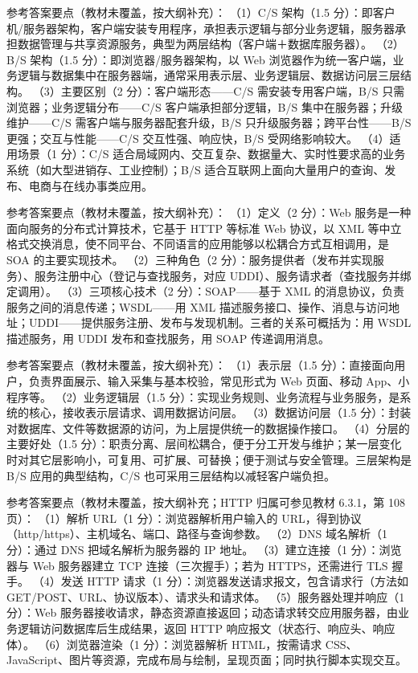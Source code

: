 \documentclass[a4paper,11pt]{article}
\begin{document}
\q 参考答案要点（教材未覆盖，按大纲补充）：
（1）C/S 架构（1.5 分）：即客户机/服务器架构，客户端安装专用程序，承担表示逻辑与部分业务逻辑，服务器承担数据管理与共享资源服务，典型为两层结构（客户端＋数据库服务器）。
（2）B/S 架构（1.5 分）：即浏览器/服务器架构，以 Web 浏览器作为统一客户端，业务逻辑与数据集中在服务器端，通常采用表示层、业务逻辑层、数据访问层三层结构。
（3）主要区别（2 分）：客户端形态——C/S 需安装专用客户端，B/S 只需浏览器；业务逻辑分布——C/S 客户端承担部分逻辑，B/S 集中在服务器；升级维护——C/S 需客户端与服务器配套升级，B/S 只升级服务器；跨平台性——B/S 更强；交互与性能——C/S 交互性强、响应快，B/S 受网络影响较大。
（4）适用场景（1 分）：C/S 适合局域网内、交互复杂、数据量大、实时性要求高的业务系统（如大型进销存、工业控制）；B/S 适合互联网上面向大量用户的查询、发布、电商与在线办事类应用。

\q 参考答案要点（教材未覆盖，按大纲补充）：
（1）定义（2 分）：Web 服务是一种面向服务的分布式计算技术，它基于 HTTP 等标准 Web 协议，以 XML 等中立格式交换消息，使不同平台、不同语言的应用能够以松耦合方式互相调用，是 SOA 的主要实现技术。
（2）三种角色（2 分）：服务提供者（发布并实现服务）、服务注册中心（登记与查找服务，对应 UDDI）、服务请求者（查找服务并绑定调用）。
（3）三项核心技术（2 分）：SOAP——基于 XML 的消息协议，负责服务之间的消息传递；WSDL——用 XML 描述服务接口、操作、消息与访问地址；UDDI——提供服务注册、发布与发现机制。三者的关系可概括为：用 WSDL 描述服务，用 UDDI 发布和查找服务，用 SOAP 传递调用消息。

\q 参考答案要点（教材未覆盖，按大纲补充）：
（1）表示层（1.5 分）：直接面向用户，负责界面展示、输入采集与基本校验，常见形式为 Web 页面、移动 App、小程序等。
（2）业务逻辑层（1.5 分）：实现业务规则、业务流程与业务服务，是系统的核心，接收表示层请求、调用数据访问层。
（3）数据访问层（1.5 分）：封装对数据库、文件等数据源的访问，为上层提供统一的数据操作接口。
（4）分层的主要好处（1.5 分）：职责分离、层间松耦合，便于分工开发与维护；某一层变化时对其它层影响小，可复用、可扩展、可替换；便于测试与安全管理。三层架构是 B/S 应用的典型结构，C/S 也可采用三层结构以减轻客户端负担。

\q 参考答案要点（教材未覆盖，按大纲补充；HTTP 归属可参见教材 6.3.1，第 108 页）：
（1）解析 URL（1 分）：浏览器解析用户输入的 URL，得到协议（http/https）、主机域名、端口、路径与查询参数。
（2）DNS 域名解析（1 分）：通过 DNS 把域名解析为服务器的 IP 地址。
（3）建立连接（1 分）：浏览器与 Web 服务器建立 TCP 连接（三次握手）；若为 HTTPS，还需进行 TLS 握手。
（4）发送 HTTP 请求（1 分）：浏览器发送请求报文，包含请求行（方法如 GET/POST、URL、协议版本）、请求头和请求体。
（5）服务器处理并响应（1 分）：Web 服务器接收请求，静态资源直接返回；动态请求转交应用服务器，由业务逻辑访问数据库后生成结果，返回 HTTP 响应报文（状态行、响应头、响应体）。
（6）浏览器渲染（1 分）：浏览器解析 HTML，按需请求 CSS、JavaScript、图片等资源，完成布局与绘制，呈现页面；同时执行脚本实现交互。
\end{document}
